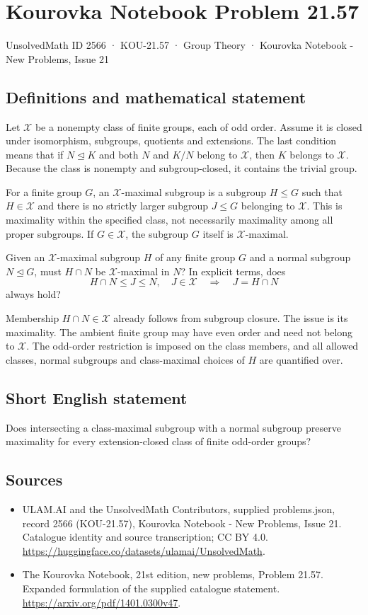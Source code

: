 \documentclass[11pt,a4paper]{article}
\begin{document}
\section*{Kourovka Notebook Problem 21.57}\label{2566}
{\small UnsolvedMath ID 2566 · KOU-21.57 · Group Theory · Kourovka Notebook - New Problems, Issue 21}
\subsection{Definitions and mathematical statement}
Let $\mathcal X$ be a nonempty class of finite groups, each of odd
order. Assume it is closed under isomorphism, subgroups, quotients and
extensions. The last condition means that if $N\trianglelefteq K$ and
both $N$ and $K/N$ belong to $\mathcal X$, then $K$ belongs to
$\mathcal X$. Because the class is nonempty and subgroup-closed,
it contains the trivial group.

For a finite group $G$, an $\mathcal X$-maximal subgroup is a subgroup
$H\le G$ such that $H\in\mathcal X$ and there is no strictly larger
subgroup $J\le G$ belonging to $\mathcal X$.
This is maximality within the specified class, not necessarily maximality
among all proper subgroups. If $G\in\mathcal X$, the subgroup $G$
itself is $\mathcal X$-maximal.

Given an $\mathcal X$-maximal subgroup $H$ of any finite group $G$
and a normal subgroup $N\trianglelefteq G$, must $H\cap N$ be
$\mathcal X$-maximal in $N$? In explicit terms, does
\[
 H\cap N\le J\le N,\quad J\in\mathcal X
 \quad\Longrightarrow\quad J=H\cap N
\]
always hold?

Membership $H\cap N\in\mathcal X$ already follows from subgroup
closure. The issue is its maximality. The ambient finite group may
have even order and need not belong to $\mathcal X$. The odd-order
restriction is imposed on the class members, and all allowed classes,
normal subgroups and class-maximal choices of $H$ are quantified over.
\subsection{Short English statement}
Does intersecting a class-maximal subgroup with a normal subgroup preserve maximality for every extension-closed class of finite odd-order groups?
\subsection{Sources}
\begin{itemize}
\item[S1] ULAM.AI and the UnsolvedMath Contributors, supplied problems.json, record 2566 (KOU-21.57), Kourovka Notebook - New Problems, Issue 21. Catalogue identity and source transcription; CC BY 4.0.
\url{https://huggingface.co/datasets/ulamai/UnsolvedMath}.
\item[S2] The Kourovka Notebook, 21st edition, new problems, Problem 21.57. Expanded formulation of the supplied catalogue statement.
\url{https://arxiv.org/pdf/1401.0300v47}.
\end{itemize}
\end{document}
